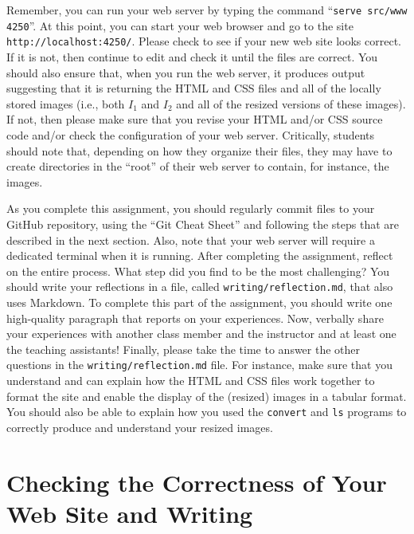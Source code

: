 \documentclass[11pt]{article}
\newcommand{\reflection}{\lstinline{writing/reflection.md}}
\newcommand{\command}[1]{``\lstinline{#1}''}
\newcommand{\program}[1]{\lstinline{#1}}
\newcommand{\url}[1]{\lstinline{#1}}
\begin{document}
Remember, you can run your web server by typing the command \command{serve
src/www 4250}. At this point, you can start your web browser and go to the site
\url{http://localhost:4250/}. Please check to see if your new web site looks
correct. If it is not, then continue to edit and check it until the files are
correct. You should also ensure that, when you run the web server, it produces
output suggesting that it is returning the HTML and CSS files and all of the
locally stored images (i.e., both $I_1$ and $I_2$ and all of the resized
versions of these images). If not, then please make sure that you revise your
HTML and/or CSS source code and/or check the configuration of your web server.
Critically, students should note that, depending on how they organize their
files, they may have to create directories in the ``root'' of their web server
to contain, for instance, the images.


As you complete this assignment, you should regularly commit files to your
GitHub repository, using the ``Git Cheat Sheet'' and following the steps that
are described in the next section. Also, note that your web server will require
a dedicated terminal when it is running. After completing the assignment,
reflect on the entire process. What step did you find to be the most
challenging? You should write your reflections in a file, called \reflection{},
that also uses Markdown. To complete this part of the assignment, you should
write one high-quality paragraph that reports on your experiences. Now, verbally
share your experiences with another class member and the instructor and at least
one the teaching assistants! Finally, please take the time to answer the other
questions in the \reflection{} file. For instance, make sure that you understand
and can explain how the HTML and CSS files work together to format the site and
enable the display of the (resized) images in a tabular format. You should also
be able to explain how you used the \program{convert} and \program{ls} programs
to correctly produce and understand your resized images.

\section*{Checking the Correctness of Your Web Site and Writing}
\end{document}
